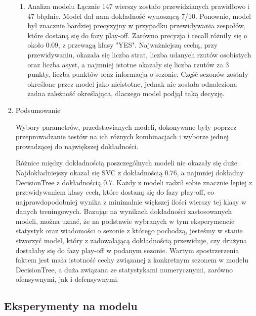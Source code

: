 \documentclass{article}
\begin{document}
\begin{enumerate}
\begin{enumerate}
        \item Analiza modelu
        Łącznie 147 wierszy zostało przewidzianych prawidłowo i 47 błędnie. Model dał nam dokładność wynoszącą 7/10. Ponownie, model był znacznie bardziej precyzyjny w przypadku przewidywania zespołów, które dostaną się do fazy play-off. Zarówno precyzja i recall różniły się o około 0.09, z przewagą klasy "YES". Najważniejszą cechą, przy przewidywaniu, okazała się liczba strat, liczba udanych rzutów osobistych oraz liczba asyst, a najmniej istotne okazały się liczba rzutów za 3 punkty, liczba punktów oraz informacja o sezonie. Część sezonów zostały określone przez model jako nieistotne, jednak nie została odnaleziona żadna zależność określająca, dlaczego model podjął taką decyzję. 
        
    \end{enumerate}
    

        \item Podsumowanie
        
        Wybory parametrów, przedstawianych modeli, dokonywane były poprzez przeprowadzanie testów na ich różnych kombinacjach i wyborze jednej prowadzącej do największej dokładności.

         Różnice między dokładnością poszczególnych modeli nie okazały się duże. Najdokładniejszy okazał się SVC z dokładnością 0.76, a najmniej dokładny DecisionTree z dokładnością 0.7. Każdy z modeli radził sobie znacznie lepiej z przewidywaniem klasy cech, które dostaną się do fazy play-off, co najprawdopodobniej wynika z minimalnie większej ilości wierszy tej klasy w danych treningowych. Bazując na wynikach dokładności zastosowanych modeli, można uznać, że na podstawie wybranych w tym eksperymencie statystyk oraz wiadomości o sezonie z którego pochodzą, jesteśmy w stanie stworzyć model, który z zadowalającą dokładnością przewiduje, czy drużyna dostałaby się do fazy play-off w podanym sezonie. Wartym spostrzerzenia faktem jest mała istotność cechy związanej z konkretnym sezonem w modelu DecisionTree, a duża związana ze statystykami numerycznymi, zarówno ofensywnymi, jak i defensywnymi.

    \end{enumerate}

    \subsection{Eksperymenty na modelu}
\end{document}
